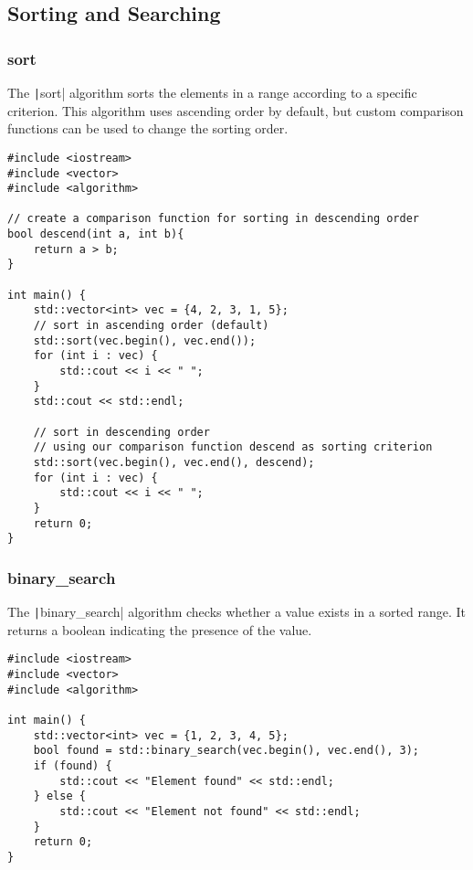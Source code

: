 \documentclass{article}
\begin{document}
\subsection{Sorting and Searching}

\subsubsection{sort}

The \texttt|sort| algorithm sorts the elements in a range according to a specific criterion. This algorithm uses ascending order by default, but custom comparison functions can be used to change the sorting order.

\begin{verbatim}
#include <iostream>
#include <vector>
#include <algorithm>

// create a comparison function for sorting in descending order
bool descend(int a, int b){
	return a > b;
}

int main() {
    std::vector<int> vec = {4, 2, 3, 1, 5};
    // sort in ascending order (default)
    std::sort(vec.begin(), vec.end());
    for (int i : vec) {
        std::cout << i << " ";
    }
    std::cout << std::endl;
    
    // sort in descending order 
    // using our comparison function descend as sorting criterion
    std::sort(vec.begin(), vec.end(), descend);
    for (int i : vec) {
        std::cout << i << " ";
    }
    return 0;
}
\end{verbatim}

\subsubsection{binary\_search}

The \texttt|binary_search| algorithm checks whether a value exists in a sorted range. It returns a boolean indicating the presence of the value.

\begin{verbatim}
#include <iostream>
#include <vector>
#include <algorithm>

int main() {
    std::vector<int> vec = {1, 2, 3, 4, 5};
    bool found = std::binary_search(vec.begin(), vec.end(), 3);
    if (found) {
        std::cout << "Element found" << std::endl;
    } else {
        std::cout << "Element not found" << std::endl;
    }
    return 0;
}
\end{verbatim}
\end{document}
